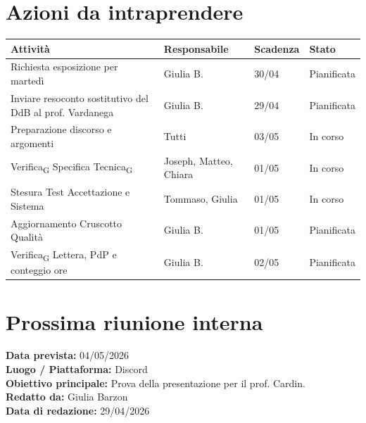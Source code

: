 \documentclass[a4paper,12pt]{article}
\newcommand{\gls}[1]{#1\textsubscript{G}}
\begin{document}
\section*{Azioni da intraprendere}
\begin{longtable}{|p{}|p{}|p{}|p{}|}
\hline
\textbf{Attività} & \textbf{Responsabile} & \textbf{Scadenza} & \textbf{Stato} \\ \hline
Richiesta esposizione per martedì & Giulia B. & 30/04 & Pianificata \\ \hline
Inviare resoconto sostitutivo del DdB al prof. Vardanega & Giulia B. & 29/04 & Pianificata \\ \hline
Preparazione discorso e argomenti & Tutti & 03/05 & In corso \\ \hline
\gls{Verifica} \gls{Specifica Tecnica} & Joseph, Matteo, Chiara & 01/05 & In corso \\ \hline
Stesura Test Accettazione e Sistema & Tommaso, Giulia & 01/05 & In corso \\ \hline
Aggiornamento Cruscotto Qualità & Giulia B. & 01/05 & Pianificata \\ \hline
\gls{Verifica} Lettera, PdP e conteggio ore & Giulia B. & 02/05 & Pianificata \\ \hline
\end{longtable}


\section*{Prossima riunione interna}
\textbf{Data prevista:} 04/05/2026 \\
\textbf{Luogo / Piattaforma:} Discord \\
\textbf{Obiettivo principale:} Prova della presentazione per il prof. Cardin. \\


\textbf{Redatto da:} Giulia Barzon \\
\textbf{Data di redazione:} 29/04/2026
\end{document}

